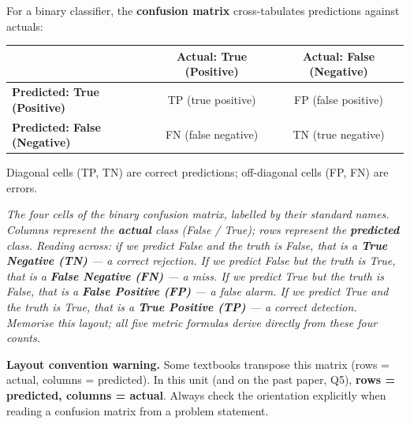 \documentclass[11pt, a4paper]{article}
\begin{document}
\begin{defbox}
For a binary classifier, the \textbf{confusion matrix} cross-tabulates predictions against actuals:

\begin{center}
\begin{tabular}{l|cc}
& \textbf{Actual: True (Positive)} & \textbf{Actual: False (Negative)} \\
\hline
\textbf{Predicted: True (Positive)} & TP (true positive) & FP (false positive) \\
\textbf{Predicted: False (Negative)} & FN (false negative) & TN (true negative) \\
\end{tabular}
\end{center}

Diagonal cells (TP, TN) are correct predictions; off-diagonal cells (FP, FN) are errors.
\end{defbox}

\begin{center}

\footnotesize\textit{The four cells of the binary confusion matrix, labelled by their standard names. Columns represent the \textbf{actual} class (False / True); rows represent the \textbf{predicted} class. Reading across: if we predict False and the truth is False, that is a \textbf{True Negative (TN)} --- a correct rejection. If we predict False but the truth is True, that is a \textbf{False Negative (FN)} --- a miss. If we predict True but the truth is False, that is a \textbf{False Positive (FP)} --- a false alarm. If we predict True and the truth is True, that is a \textbf{True Positive (TP)} --- a correct detection. Memorise this layout; all five metric formulas derive directly from these four counts.}
\end{center}

\begin{notebox}
\textbf{Layout convention warning.} Some textbooks transpose this matrix (rows = actual, columns = predicted). In this unit (and on the past paper, Q5), \textbf{rows = predicted, columns = actual}. Always check the orientation explicitly when reading a confusion matrix from a problem statement.
\end{notebox}
\end{document}
